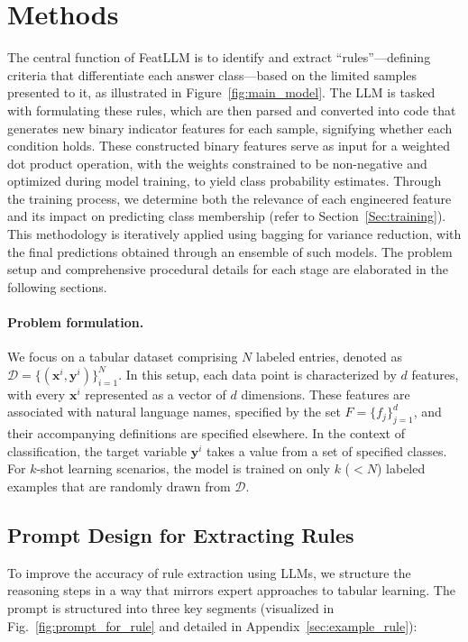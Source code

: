 \section{Methods}
The central function of \textsf{FeatLLM} is to identify and extract “rules”—defining criteria that differentiate each answer class—based on the limited samples presented to it, as illustrated in Figure~\ref{fig:main_model}. The LLM is tasked with formulating these rules, which are then parsed and converted into code that generates new binary indicator features for each sample, signifying whether each condition holds. These constructed binary features serve as input for a weighted dot product operation, with the weights constrained to be non-negative and optimized during model training, to yield class probability estimates. Through the training process, we determine both the relevance of each engineered feature and its impact on predicting class membership (refer to Section~\ref{Sec:training}). This methodology is iteratively applied using bagging for variance reduction, with the final predictions obtained through an ensemble of such models. The problem setup and comprehensive procedural details for each stage are elaborated in the following sections.

\vspace*{-0.12in}
\paragraph{Problem formulation.} We focus on a tabular dataset comprising $N$ labeled entries, denoted as $\mathcal{D} = \{(\mathbf{x}^i, \mathbf{y}^i)\}_{i=1}^{N}$. In this setup, each data point is characterized by $d$ features, with every $\mathbf{x}^i$ represented as a vector of $d$ dimensions. These features are associated with natural language names, specified by the set $F = \{f_j\}_{j=1}^{d}$, and their accompanying definitions are specified elsewhere. In the context of classification, the target variable $\mathbf{y}^i$ takes a value from a set of specified classes. For $k$-shot learning scenarios, the model is trained on only $k$ ($<N$) labeled examples that are randomly drawn from $\mathcal{D}$.

\subsection{Prompt Design for Extracting Rules}
\label{Sec:prompt_design}
To improve the accuracy of rule extraction using LLMs, we structure the reasoning steps in a way that mirrors expert approaches to tabular learning. The prompt is structured into three key segments (visualized in Fig.~\ref{fig:prompt_for_rule} and detailed in Appendix~\ref{sec:example_rule}):

